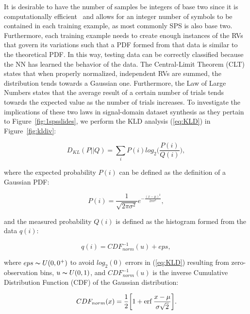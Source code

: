 It is desirable to have the number of samples be integers of base two since it is computationally efficient~\cite{cs231} and allows for an integer number of symbols to be contained in each training example, as most commonly SPS is also base two. Furthermore, each training example needs to create enough instances of the RVs that govern its variations such that a PDF formed from that data is similar to the theoretical PDF. In this way, testing data can be correctly classified because the NN has learned the behavior of the data. The Central-Limit Theorem (CLT) states that when properly normalized, independent RVs are summed, the distribution tends towards a Gaussian one. Furthermore, the Law of Large Numbers states that the average result of a certain number of trials tends towards the expected value as the number of trials increases. To investigate the implications of these two laws in signal-domain dataset synthesis as they pertain to Figure~\ref{fig:1spsslides}, we perform the KLD analysis (\ref{eq:KLD}) in Figure~\ref{fig:kldiv}:

\begin{equation}
\label{eq:KLD}
D_{KL}(P||Q) = \sum_{i} P(i) log_2\bigg(\frac{P(i)}{Q(i)}\bigg),
\end{equation}

\noindent where the expected probability $P(i)$ can be defined as the definition of a Gaussian PDF:

\begin{equation}
\label{eq:pi}
P(i) = \frac{1}{\sqrt{2\pi\sigma^2}} e^{-\frac{(x-\mu)^2}{2\pi\sigma^2}},
\end{equation}

\noindent and the measured probability $Q(i)$ is defined as the histogram formed from the data $q(i)$:

\begin{equation}
\label{eq:qi}
q(i) = CDF_{norm}^{-1}(u) + eps,
\end{equation}

\noindent where $eps \thicksim U(0,0^+)$ to avoid $log_2(0)$ errors in (\ref{eq:KLD}) resulting from zero-observation bins, $u \thicksim U(0,1)$, and $CDF_{norm}^{-1}(u)$ is the inverse Cumulative Distribution Function (CDF) of the Gaussian distribution:


\begin{equation}
\label{eq:cdfinv}
CDF_{norm}(x) = \frac{1}{2} \bigg[ 1 + \operatorname{erf} \frac{x - \mu}{\sigma\sqrt{2}}\bigg].
\end{equation}

